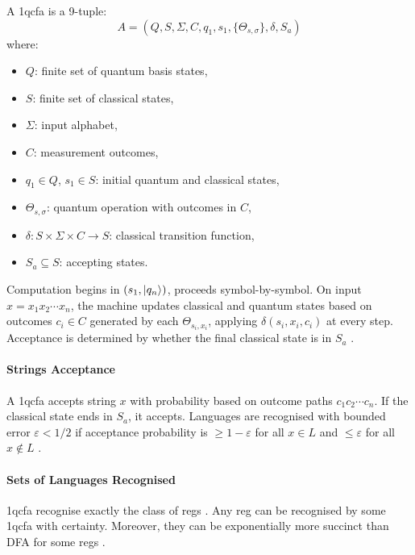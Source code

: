 \begin{definition}
A \gls{1qcfa} is a 9-tuple:
\[
A = (Q, S, \Sigma, C, q_1, s_1, \{\Theta_{s,\sigma}\}, \delta, S_a)
\]
where:
\begin{itemize}
    \item $Q$: finite set of quantum basis states,
    \item $S$: finite set of classical states,
    \item $\Sigma$: input alphabet,
    \item $C$: measurement outcomes,
    \item $q_1 \in Q$, $s_1 \in S$: initial quantum and classical states,
    \item $\Theta_{s,\sigma}$: quantum operation with outcomes in $C$,
    \item $\delta: S \times \Sigma \times C \to S$: classical transition function,
    \item $S_a \subseteq S$: accepting states.
\end{itemize}
\end{definition}

Computation begins in $(s_1, \ket{q_n})$, proceeds symbol-by-symbol. On input $x = x_1x_2\cdots x_n$, the machine updates classical and quantum states based on outcomes $c_i \in C$ generated by each $\Theta_{s_i,x_i}$, applying $\delta(s_i,x_i,c_i)$ at every step. Acceptance is determined by whether the final classical state is in $S_a$ \cite{li2015hybrid}.

\paragraph{Strings Acceptance}  
A \gls{1qcfa} accepts string $x$ with probability based on outcome paths $c_1c_2\cdots c_n$. If the classical state ends in $S_a$, it accepts. Languages are recognised with bounded error $\varepsilon < 1/2$ if acceptance probability is $\geq 1-\varepsilon$ for all $x \in L$ and $\leq \varepsilon$ for all $x \notin L$ \cite{li2015hybrid, zheng2012one}.

\paragraph{Sets of Languages Recognised}  
\gls{1qcfa} recognise exactly the class of \glspl{reg} \cite{zheng2012one}. Any \gls{reg} can be recognised by some \gls{1qcfa} with certainty. Moreover, they can be exponentially more succinct than DFA for some \glspl{reg} \cite{xiao2021state}.

